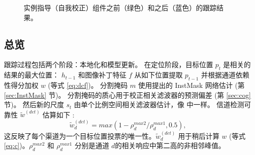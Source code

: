 \begin{figure}
                       \hspace{-0.6em}
                       \hspace{-0.6em}
    \caption{实例指导（自我校正）组件之前（绿色）和之后（蓝色）的跟踪结果。}
    \label{fig:IGSC}
\end{figure}

\subsection{总览}
跟踪过程包括两个阶段：本地化和模型更新。
在定位阶段，目标位置 $p_t$ 是相关的结果的最大位置： $h_{t-1}$ 和图像补丁特征 $f$ 从如下位置提取 $p_{t-1}$ 并根据通道依赖性得分加权 $w$ (等式 \ref{eq:dcf})。
分割掩码 $m$ 使用提出的 InstMask 网络估计 (第 \ref{sec:InstMask} 节)。
分割掩码的质心用于校正相关滤波器的预测偏差 (第 \ref{sec:cog} 节)。
然后新的尺度 $s_t$ 由单个比例空间相关滤波器估计，像 \cite{Danelljan2014AccurateSE} 中一样。
信道检测可靠性 $\tilde{w}^{(det)}$ 估算如下 \cite{Lukezic2017DiscriminativeCF}:
\begin{equation} \label{eq:det}
\tilde w_d^{(det)} = max(1 - \rho_d^{max2} / \rho_d^{max1}, 0.5),
\end{equation}
这反映了每个渠道为一个目标位置投票的唯一性。$\tilde w_d^{(det)}$ 用于稍后计算 $w$ (等式 \ref{eq:c})。$\rho_d^{max2}$ 和 $\rho_d^{max1}$ 分别是通道 $d$的相关响应中第二高的非相邻峰值。

